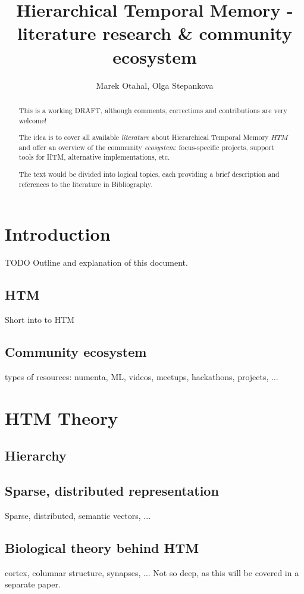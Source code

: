 \documentclass[a4,IEEEconf]{article}
\title{Hierarchical Temporal Memory - literature research \& community ecosystem}
\author{Marek Otahal, Olga Stepankova}
\begin{document}
\maketitle

\begin{abstract}
This is a working DRAFT, although comments, corrections and contributions are very welcome! 

The idea is to cover all available \textit{literature} about Hierarchical Temporal Memory \(HTM\) and offer an overview of the community \textit{ecosystem}: focus-specific projects, support tools for HTM, alternative implementations, etc. 

The text would be divided into logical topics, each providing a brief description and references to the literature in Bibliography.
\end{abstract}

\tableofcontents

\section{Introduction}
TODO Outline and explanation of this document.
\subsection{HTM}
Short into to HTM
\subsection{Community ecosystem}
types of resources: numenta, ML, videos, meetups, hackathons, projects, ...

\section{HTM Theory}
\subsection{Hierarchy}
\subsection{Sparse, distributed representation}
Sparse, distributed, semantic vectors, ...
\subsection{Biological theory behind HTM}
cortex, columnar structure, synapses, ...
Not so deep, as this will be covered in a separate paper.
\end{document}
